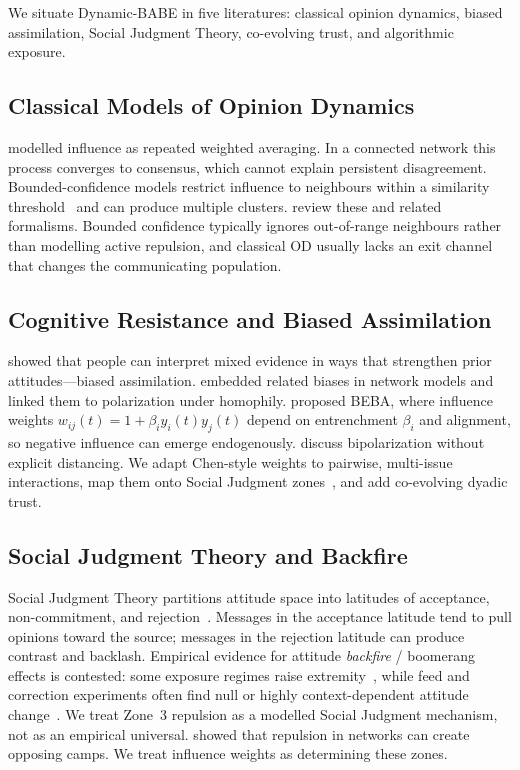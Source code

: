 We situate Dynamic-BABE in five literatures: classical opinion dynamics, biased assimilation, Social Judgment Theory, co-evolving trust, and algorithmic exposure.

\subsection{Classical Models of Opinion Dynamics}
\citet{DeGroot1974} modelled influence as repeated weighted averaging. In a connected network this process converges to consensus, which cannot explain persistent disagreement. Bounded-confidence models restrict influence to neighbours within a similarity threshold~\citep{Hegselmann2002, Deffuant2000} and can produce multiple clusters. \citet{Flache2017} review these and related formalisms. Bounded confidence typically ignores out-of-range neighbours rather than modelling active repulsion, and classical OD usually lacks an exit channel that changes the communicating population.

\subsection{Cognitive Resistance and Biased Assimilation}
\citet{Lord1979} showed that people can interpret mixed evidence in ways that strengthen prior attitudes---biased assimilation. \citet{Dandekar2013} embedded related biases in network models and linked them to polarization under homophily. \citet{Chen2021} proposed BEBA, where influence weights $w_{ij}(t) = 1 + \beta_i y_i(t) y_j(t)$ depend on entrenchment $\beta_i$ and alignment, so negative influence can emerge endogenously. \citet{Mas2013} discuss bipolarization without explicit distancing. We adapt Chen-style weights to pairwise, multi-issue interactions, map them onto Social Judgment zones~\citep{Sherif1961, Jager2005}, and add co-evolving dyadic trust.

\subsection{Social Judgment Theory and Backfire}
Social Judgment Theory partitions attitude space into latitudes of acceptance, non-commitment, and rejection~\citep{Sherif1961}. Messages in the acceptance latitude tend to pull opinions toward the source; messages in the rejection latitude can produce contrast and backlash. Empirical evidence for attitude \emph{backfire} / boomerang effects is contested: some exposure regimes raise extremity~\citep{Bail2018}, while feed and correction experiments often find null or highly context-dependent attitude change~\citep{Guess2023, Levy2021}. We treat Zone~3 repulsion as a modelled Social Judgment mechanism, not as an empirical universal. \citet{Jager2005} showed that repulsion in networks can create opposing camps. We treat influence weights as determining these zones.

